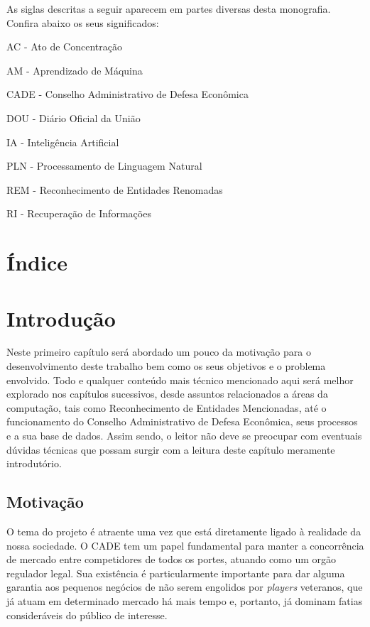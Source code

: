 \documentclass[11pt]{report}
\begin{document}
\indent\indent As siglas descritas a seguir aparecem em partes diversas desta monografia. Confira abaixo
os seus significados:

\vspace*{20px}

\noindent AC - Ato de Concentração

\vspace*{8px}
\noindent AM - Aprendizado de Máquina

\vspace*{8px}
\noindent CADE - Conselho Administrativo de Defesa Econômica

\vspace*{8px}
\noindent DOU - Diário Oficial da União

\vspace*{8px}
\noindent IA - Inteligência Artificial

\vspace*{8px}
\noindent PLN - Processamento de Linguagem Natural

\vspace*{8px}
\noindent REM - Reconhecimento de Entidades Renomadas

\vspace*{8px}
\noindent RI - Recuperação de Informações

\pagebreak
\thispagestyle{empty}
\chapter*{Índice}

\pagebreak
\chapter{Introdução}
\indent\indent Neste primeiro capítulo será abordado um pouco da motivação para o desenvolvimento deste trabalho bem como os seus objetivos e o problema envolvido.
Todo e qualquer conteúdo mais técnico mencionado aqui será melhor explorado nos capítulos sucessivos, desde assuntos relacionados a áreas da computação, tais como
Reconhecimento de Entidades Mencionadas, até o funcionamento do Conselho Administrativo de Defesa Econômica, seus processos e a sua base de dados. Assim sendo, o
leitor não deve se preocupar com eventuais dúvidas técnicas que possam surgir com a leitura deste capítulo meramente introdutório.

\section{Motivação}
\indent\indent O tema do projeto é atraente uma vez que está diretamente ligado à realidade da nossa sociedade. O CADE tem um papel
fundamental para manter a concorrência de mercado entre competidores de todos os portes, atuando como um orgão regulador legal. Sua existência é
particularmente importante para dar alguma garantia aos pequenos negócios de não serem engolidos por \textit{players} veteranos, que
já atuam em determinado mercado há mais tempo e, portanto, já dominam fatias consideráveis do público de interesse.
\end{document}
